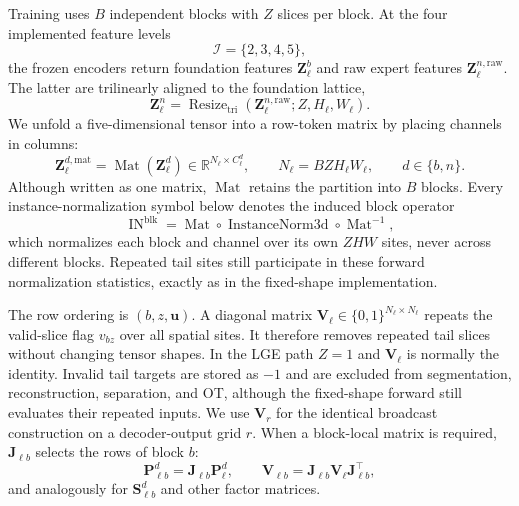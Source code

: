 \documentclass[10pt]{article}
\newcommand{\R}{\mathbb{R}}
\newcommand{\cI}{\mathcal{I}}
\newcommand{\Mat}{\operatorname{Mat}}
\newcommand{\Resize}{\operatorname{Resize}}
\newcommand{\IN}{\operatorname{IN}}
\begin{document}
Training uses $B$ independent blocks with $Z$ slices per block.  At the four
implemented feature levels
\begin{equation}
    \cI=\{2,3,4,5\},
\end{equation}
the frozen encoders return foundation features $\bm Z^b_\ell$ and raw expert
features $\bm Z^{n,\mathrm{raw}}_\ell$.  The latter are trilinearly aligned to the
foundation lattice,
\begin{equation}
    \bm Z^n_\ell
    =\Resize_{\mathrm{tri}}
      (\bm Z^{n,\mathrm{raw}}_\ell;Z,H_\ell,W_\ell).
\end{equation}
We unfold a five-dimensional tensor into a row-token matrix by placing channels
in columns:
\begin{equation}
    \bm Z^{d,\mathrm{mat}}_\ell=\Mat(\bm Z^d_\ell)
       \in\R^{N_\ell\times C^d_\ell},
    \qquad N_\ell=BZH_\ell W_\ell,
    \qquad d\in\{b,n\}.
    \label{eq:matrix-features}
\end{equation}
Although written as one matrix, $\Mat$ retains the partition into $B$ blocks.
Every instance-normalization symbol below denotes the induced block operator
\begin{equation}
    \IN^{\mathrm{blk}}
    =\Mat\circ\operatorname{InstanceNorm3d}\circ\Mat^{-1},
\end{equation}
which normalizes each block and channel over its own $ZHW$ sites, never across
different blocks.  Repeated tail sites still participate in these forward
normalization statistics, exactly as in the fixed-shape implementation.

The row ordering is $(b,z,\bm u)$.  A diagonal matrix
$\bm V_\ell\in\{0,1\}^{N_\ell\times N_\ell}$ repeats the valid-slice flag
$v_{bz}$ over all spatial sites.  It therefore removes repeated tail slices
without changing tensor shapes.  In the LGE path $Z=1$ and $\bm V_\ell$ is
normally the identity.  Invalid tail targets are stored as $-1$ and are
excluded from segmentation, reconstruction, separation, and OT, although the
fixed-shape forward still evaluates their repeated inputs.  We use $\bm V_r$
for the identical broadcast construction on a decoder-output grid $r$.
When a block-local matrix is required, $\bm J_{\ell b}$ selects the rows of
block $b$:
\begin{equation}
 \bm P^d_{\ell b}=\bm J_{\ell b}\bm P^d_\ell,\qquad
 \bm V_{\ell b}=\bm J_{\ell b}\bm V_\ell\bm J_{\ell b}^{\top},
\end{equation}
and analogously for $\bm S^d_{\ell b}$ and other factor matrices.
\end{document}
